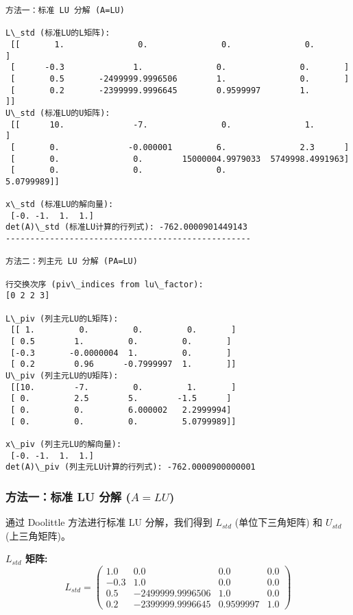 \documentclass[11pt]{article}
\begin{document}
    \begin{Verbatim}[commandchars=\\\{\}]
方法一：标准 LU 分解 (A=LU)

L\_std (标准LU的L矩阵):
 [[       1.               0.               0.               0.       ]
 [      -0.3              1.               0.               0.       ]
 [       0.5       -2499999.9996506        1.               0.       ]
 [       0.2       -2399999.9996645        0.9599997        1.       ]]
U\_std (标准LU的U矩阵):
 [[      10.              -7.               0.               1.       ]
 [       0.              -0.000001         6.               2.3      ]
 [       0.               0.        15000004.9979033  5749998.4991963]
 [       0.               0.               0.               5.0799989]]

x\_std (标准LU的解向量):
 [-0. -1.  1.  1.]
det(A)\_std (标准LU计算的行列式): -762.0000901449143
--------------------------------------------------

方法二：列主元 LU 分解 (PA=LU)

行交换次序 (piv\_indices from lu\_factor):
[0 2 2 3]

L\_piv (列主元LU的L矩阵):
 [[ 1.         0.         0.         0.       ]
 [ 0.5        1.         0.         0.       ]
 [-0.3       -0.0000004  1.         0.       ]
 [ 0.2        0.96      -0.7999997  1.       ]]
U\_piv (列主元LU的U矩阵):
 [[10.        -7.         0.         1.       ]
 [ 0.         2.5        5.        -1.5      ]
 [ 0.         0.         6.000002   2.2999994]
 [ 0.         0.         0.         5.0799989]]

x\_piv (列主元LU的解向量):
 [-0. -1.  1.  1.]
det(A)\_piv (列主元LU计算的行列式): -762.0000900000001
    \end{Verbatim}

    \subsubsection{\texorpdfstring{方法一：标准 LU 分解
(\(A=LU\))}{方法一：标准 LU 分解 (A=LU)}}\label{ux65b9ux6cd5ux4e00ux6807ux51c6-lu-ux5206ux89e3-alu}

通过 Doolittle 方法进行标准 LU 分解，我们得到 \(L_{std}\)
(单位下三角矩阵) 和 \(U_{std}\) (上三角矩阵)。

\textbf{\(L_{std}\) 矩阵:} \[ L_{std} = \begin{pmatrix}
1.0 & 0.0 & 0.0 & 0.0 \\
-0.3 & 1.0 & 0.0 & 0.0 \\
0.5 & -2499999.9996506 & 1.0 & 0.0 \\
0.2 & -2399999.9996645 & 0.9599997 & 1.0
\end{pmatrix} \]
\end{document}
